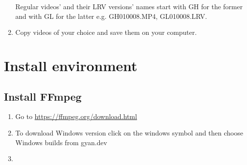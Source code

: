 \documentclass[a4paper,12pt]{book}
\begin{document}
\begin{enumerate}
	Regular videos’ and their LRV versions’ names start with GH for the former and with GL for the latter e.g. GH010008.MP4, GL010008.LRV. \\
	\item Copy videos of your choice and save them on your computer.
\end{enumerate}

\chapter{Install environment}
\section{Install FFmpeg}
\begin{enumerate}
	\item Go to \url{https://ffmpeg.org/download.html}
	\item \begin{minipage}[t]{\linewidth}
		\raggedright
		\medskip	
	\end{minipage}
	To download Windows version click on the windows symbol and then choose Windows builds from gyan.dev
	\item \begin{minipage}[t]{\linewidth}
		\raggedright
\end{minipage}
\end{enumerate}
\end{document}
